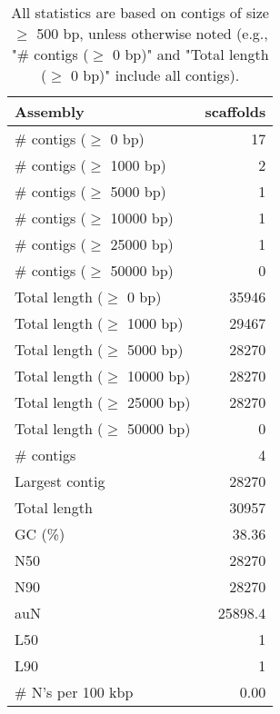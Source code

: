 \documentclass[12pt,a4paper]{article}
\begin{document}
\begin{table}[ht]
\begin{center}
\caption{All statistics are based on contigs of size $\geq$ 500 bp, unless otherwise noted (e.g., "\# contigs ($\geq$ 0 bp)" and "Total length ($\geq$ 0 bp)" include all contigs).}
\begin{tabular}{|l*{1}{|r}|}
\hline
Assembly & scaffolds \\ \hline
\# contigs ($\geq$ 0 bp) & 17 \\ \hline
\# contigs ($\geq$ 1000 bp) & 2 \\ \hline
\# contigs ($\geq$ 5000 bp) & 1 \\ \hline
\# contigs ($\geq$ 10000 bp) & 1 \\ \hline
\# contigs ($\geq$ 25000 bp) & 1 \\ \hline
\# contigs ($\geq$ 50000 bp) & 0 \\ \hline
Total length ($\geq$ 0 bp) & 35946 \\ \hline
Total length ($\geq$ 1000 bp) & 29467 \\ \hline
Total length ($\geq$ 5000 bp) & 28270 \\ \hline
Total length ($\geq$ 10000 bp) & 28270 \\ \hline
Total length ($\geq$ 25000 bp) & 28270 \\ \hline
Total length ($\geq$ 50000 bp) & 0 \\ \hline
\# contigs & 4 \\ \hline
Largest contig & 28270 \\ \hline
Total length & 30957 \\ \hline
GC (\%) & 38.36 \\ \hline
N50 & 28270 \\ \hline
N90 & 28270 \\ \hline
auN & 25898.4 \\ \hline
L50 & 1 \\ \hline
L90 & 1 \\ \hline
\# N's per 100 kbp & 0.00 \\ \hline
\end{tabular}
\end{center}
\end{table}
\end{document}
